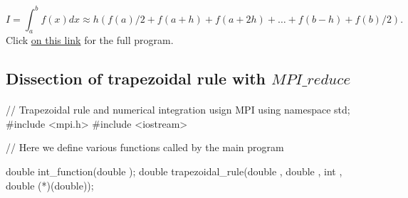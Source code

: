 \documentclass[%
oneside,                 %
final,                   %
10pt]{article}
\begin{document}
\noindent
\[
   I=\int_a^bf(x) dx\approx h\left(f(a)/2 + f(a+h) +f(a+2h)+\dots +f(b-h)+ f(b)/2\right).
\]
Click \href{{https://github.com/CompPhysics/ComputationalPhysics2/blob/gh-pages/doc/Programs/LecturePrograms/programs/MPI/chapter07/program6.cpp}}{on this link} for the full program.



\subsection{Dissection of trapezoidal rule with $MPI\_reduce$}

\paragraph{}


















\bcppcod
//    Trapezoidal rule and numerical integration usign MPI
using namespace std;
#include <mpi.h>
#include <iostream>

//     Here we define various functions called by the main program

double int_function(double );
double trapezoidal_rule(double , double , int , double (*)(double));
\end{document}

